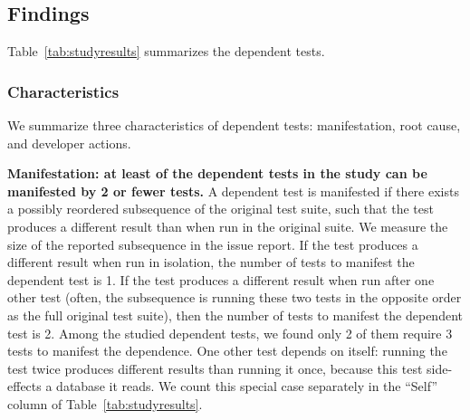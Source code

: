 \subsection{Findings}
\label{sec:studyfindings}



Table~\ref{tab:studyresults} summarizes the dependent tests.


\subsubsection{Characteristics}


We summarize three characteristics of dependent tests:
manifestation, root cause, and developer actions.


\vspace{1mm}
\noindent \textbf{{Manifestation: at least \pertange of the dependent
tests in the study can be manifested by 2 or fewer tests.}}
A dependent test is manifested if there exists a possibly reordered
subsequence of the original test suite, such that the test
produces a different
result than when run in the original suite.
We measure the size of the reported subsequence 
in the issue report.
If the test produces a different result when run
in isolation, the number of tests to manifest
the dependent test is 1.
If the test produces a different result
when run after one other test (often, the subsequence is
running these two tests in the opposite order as the full original test
suite), then the number of tests to manifest the dependent test is 2.
Among the \dtnum studied dependent tests, we found only 2 of them
require 3 tests to manifest the dependence.
One other test depends on itself:
running the test twice produces different results than running it once,
because this test side-effects a database it reads.
We count this special case separately in the ``Self'' column
of Table~\ref{tab:studyresults}.

